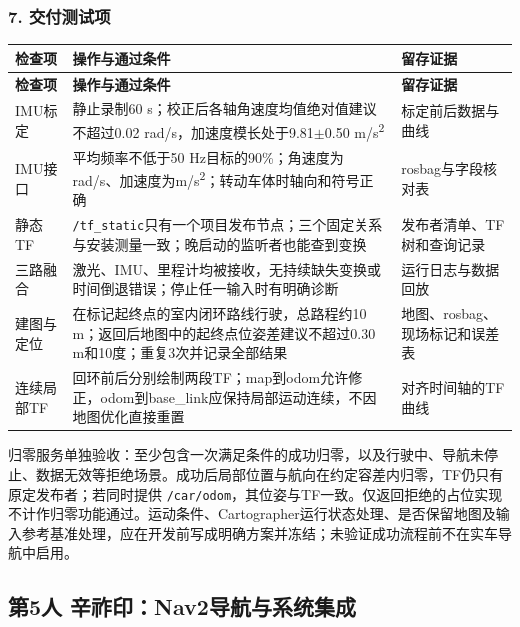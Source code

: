 \documentclass[UTF8,fontset=fandol,11pt,a4paper]{ctexart}
\begin{document}
\subsubsection*{7. 交付测试项}
{\small
\begin{longtable}{|>{\raggedright\arraybackslash}p{}|>{\raggedright\arraybackslash}p{}|>{\raggedright\arraybackslash}p{}|}
\hline
\rowcolor{TableHead} \textbf{检查项} & \textbf{操作与通过条件} & \textbf{留存证据} \\ \hline
\endfirsthead
\hline
\rowcolor{TableHead} \textbf{检查项} & \textbf{操作与通过条件} & \textbf{留存证据} \\ \hline
\endhead
\endfoot
\endlastfoot
IMU标定 & 静止录制60 s；校正后各轴角速度均值绝对值建议不超过0.02 rad/s，加速度模长处于9.81\(\pm\)0.50 m/s\textsuperscript{2} & 标定前后数据与曲线 \\ \hline
IMU接口 & 平均频率不低于50 Hz目标的90\%；角速度为rad/s、加速度为m/s\textsuperscript{2}；转动车体时轴向和符号正确 & rosbag与字段核对表 \\ \hline
静态TF & \nolinkurl{/tf_static}只有一个项目发布节点；三个固定关系与安装测量一致；晚启动的监听者也能查到变换 & 发布者清单、TF树和查询记录 \\ \hline
三路融合 & 激光、IMU、里程计均被接收，无持续缺失变换或时间倒退错误；停止任一输入时有明确诊断 & 运行日志与数据回放 \\ \hline
建图与定位 & 在标记起终点的室内闭环路线行驶，总路程约10 m；返回后地图中的起终点位姿差建议不超过0.30 m和10度；重复3次并记录全部结果 & 地图、rosbag、现场标记和误差表 \\ \hline
连续局部TF & 回环前后分别绘制两段TF；map到odom允许修正，odom到base\_link应保持局部运动连续，不因地图优化直接重置 & 对齐时间轴的TF曲线 \\ \hline
\end{longtable}
}
归零服务单独验收：至少包含一次满足条件的成功归零，以及行驶中、导航未停止、数据无效等拒绝场景。成功后局部位置与航向在约定容差内归零，TF仍只有原定发布者；若同时提供 \nolinkurl{/car/odom}，其位姿与TF一致。仅返回拒绝的占位实现不计作归零功能通过。运动条件、Cartographer运行状态处理、是否保留地图及输入参考基准处理，应在开发前写成明确方案并冻结；未验证成功流程前不在实车导航中启用。

\subsection{第5人 辛祚印：Nav2导航与系统集成}
\end{document}
